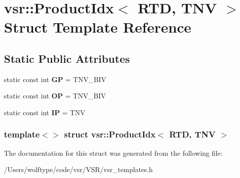 \hypertarget{structvsr_1_1_product_idx_3_01_r_t_d_00_01_t_n_v_01_4}{\section{vsr\-:\-:Product\-Idx$<$ R\-T\-D, T\-N\-V $>$ Struct Template Reference}
\label{structvsr_1_1_product_idx_3_01_r_t_d_00_01_t_n_v_01_4}
}
\subsection*{Static Public Attributes}
\begin{DoxyCompactItemize}
\item 
\hypertarget{structvsr_1_1_product_idx_3_01_r_t_d_00_01_t_n_v_01_4_a3c59ee768e97098362d8e1c45560f568}{static const int {\bfseries G\-P} = T\-N\-V\-\_\-\-B\-I\-V}\label{structvsr_1_1_product_idx_3_01_r_t_d_00_01_t_n_v_01_4_a3c59ee768e97098362d8e1c45560f568}

\item 
\hypertarget{structvsr_1_1_product_idx_3_01_r_t_d_00_01_t_n_v_01_4_a06f5ccedec35198d19b5208885b0b728}{static const int {\bfseries O\-P} = T\-N\-V\-\_\-\-B\-I\-V}\label{structvsr_1_1_product_idx_3_01_r_t_d_00_01_t_n_v_01_4_a06f5ccedec35198d19b5208885b0b728}

\item 
\hypertarget{structvsr_1_1_product_idx_3_01_r_t_d_00_01_t_n_v_01_4_a23ba78cb4af3a08de4b85e0962844e52}{static const int {\bfseries I\-P} = T\-N\-V}\label{structvsr_1_1_product_idx_3_01_r_t_d_00_01_t_n_v_01_4_a23ba78cb4af3a08de4b85e0962844e52}

\end{DoxyCompactItemize}
\subsubsection*{template$<$$>$ struct vsr\-::\-Product\-Idx$<$ R\-T\-D, T\-N\-V $>$}



The documentation for this struct was generated from the following file\-:\begin{DoxyCompactItemize}
\item 
/\-Users/wolftype/code/vsr/\-V\-S\-R/vsr\-\_\-templates.\-h\end{DoxyCompactItemize}
